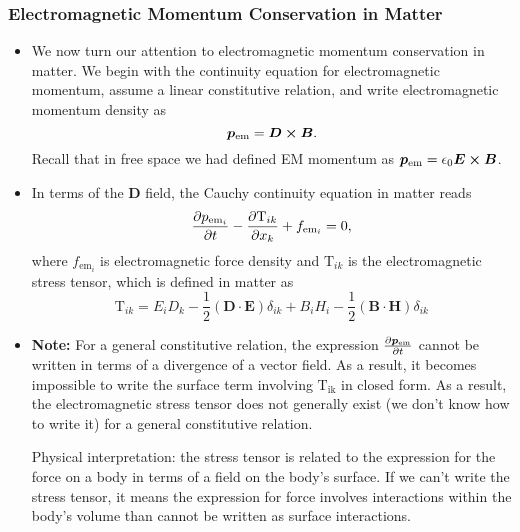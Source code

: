 \documentclass[11pt, a4paper]{article}
\renewcommand{\vec}[1]{\bm{#1}} %
\newcommand{\E}{\vec{E}} %
\newcommand{\D}{\vec{D}}  %
\newcommand{\B}{\vec{B}} %
\renewcommand{\H}{\vec{H}}  %
\newcommand{\TT}{\mathrm{T}}  %
\newcommand{\ee}{\epsilon_{0}}  %
\begin{document}
\subsubsection{Electromagnetic Momentum Conservation in Matter}
\begin{itemize}
	\item We now turn our attention to electromagnetic momentum conservation in matter. We begin with the continuity equation for electromagnetic momentum, assume a linear constitutive relation, and write electromagnetic momentum density as
	\begin{equation*}
		\vec{p}_{\text{em}} = \D \cross \B.
	\end{equation*}
	Recall that in free space we had defined EM momentum as $ \vec{p}_{\text{em}} = \ee \E \cross \B $.
	
	\item In terms of the $ \D $ field, the Cauchy continuity equation in matter reads
	\begin{equation*}
		\pdv{p_{\text{em}_{i}}}{t} - \pdv{\TT_{ik}}{x_{k}} + f_{\text{em}_{i}} = 0,
	\end{equation*}
	where $ f_{\text{em}_{i}} $ is electromagnetic force density and $ \TT_{ik} $ is the electromagnetic stress tensor, which is defined in matter as
	\begin{equation*}
		\TT_{ik} = E_{i}D_{k} - \frac{1}{2}(\D \cdot \E)\delta_{ik} + B_{i}H_{i} - \frac{1}{2}(\B \cdot \H)\delta _{ik}
	\end{equation*}
	
	\item \textbf{Note:} For a general constitutive relation, the expression $ \pdv{\vec{p}_{\text{em}} }{t} $ cannot be written in terms of a divergence of a vector field. As a result, it becomes impossible to write the surface term involving $ \TT_{\text{ik}} $ in closed form. As a result, the electromagnetic stress tensor does not generally exist (we don't know how to write it) for a general constitutive relation.
	
	Physical interpretation: the stress tensor is related to the expression for the force on a body in terms of a field on the body's surface. If we can't write the stress tensor, it means the expression for force involves interactions within the body's volume than cannot be written as surface interactions.
	
\end{itemize}
\end{document}
